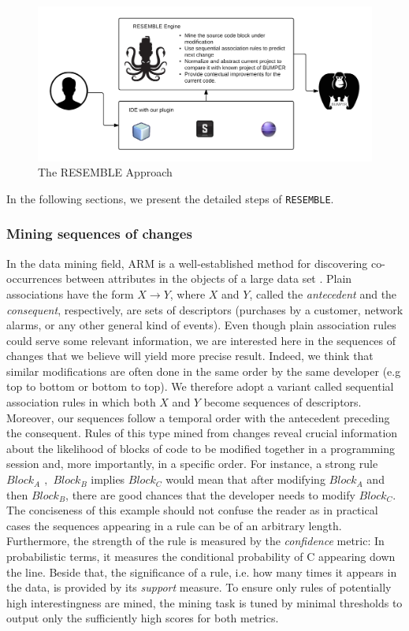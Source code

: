 \begin{figure}[h!]
    \includegraphics[scale=0.9]{media/resemble-approach.png}
    \caption{The RESEMBLE Approach
    \label{fig:RESEMBLE-approach}}
\end{figure}

In the following sections, we present the detailed steps of {\tt RESEMBLE}.

\subsubsection{Mining sequences of changes}

In the data mining field, ARM is a
well-established method for discovering co-occurrences between attributes
in the objects of a large data set \cite{Gregory1991,HEIKKI1997}. Plain
associations have the form $X \rightarrow Y$, where $X$ and $Y$,
called the \textit{antecedent} and the \textit{consequent}, respectively, are sets of descriptors
(purchases by a customer, network alarms, or any other general kind of events).
Even though plain association rules could serve some relevant information, we are interested here in
the sequences of changes that we believe will yield more precise result. Indeed, we think that similar modifications are often done in the same order by the same developer (e.g top to bottom or bottom to top).
We therefore adopt a variant called sequential association rules in which
both $X$ and $Y$ become sequences of descriptors.
Moreover, our sequences follow a temporal order with the antecedent preceding the consequent.
Rules of this type mined from changes reveal crucial
information about the likelihood of blocks of code to be modified  together in a programming session
and, more importantly, in a specific order.
For instance, a strong rule \emph{$Block_A$ $,$ $Block_B$} implies \emph{$Block_C$} would mean that after modifying $Block_A$ and then $Block_B$, there are good chances that the developer needs to modify $Block_C$.
The conciseness of this example should not confuse the reader as in practical cases
the sequences appearing in a rule can be of an arbitrary length.
Furthermore, the strength of the rule is measured by the \textit{confidence} metric: In probabilistic terms,
it measures the conditional probability of C appearing down the line.
Beside that, the significance of a rule, i.e. how many times it appears in the data,
is provided by its \textit{support} measure.
To ensure only rules of potentially high interestingness are mined,
the mining task is tuned by minimal thresholds to
output only the sufficiently high scores for both metrics.

